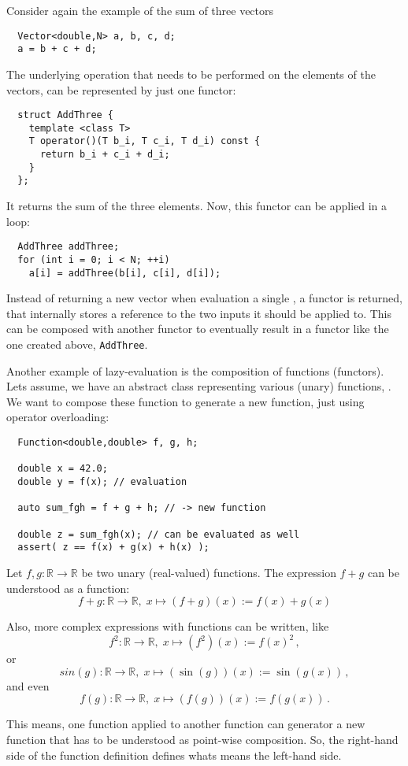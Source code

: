 \begin{example}
  Consider again the example of the sum of three vectors
  \begin{verbatim}
  Vector<double,N> a, b, c, d;
  a = b + c + d;
  \end{verbatim}
  The underlying operation that needs to be performed on the elements of the vectors, can be represented by
  just one functor:
  \begin{verbatim}
  struct AddThree {
    template <class T>
    T operator()(T b_i, T c_i, T d_i) const {
      return b_i + c_i + d_i;
    }
  };
  \end{verbatim}
  It returns the sum of the three elements. Now, this functor can be applied in a loop:
  \begin{verbatim}
  AddThree addThree;
  for (int i = 0; i < N; ++i)
    a[i] = addThree(b[i], c[i], d[i]);
  \end{verbatim}
  Instead of returning a new vector when evaluation a single , a functor is returned, that internally stores
  a reference to the two inputs it should be applied to. This can be composed with another functor to eventually result in a functor like
  the one created above, \texttt{AddThree}.
\end{example}

\begin{example}
  Another example of lazy-evaluation is the composition of functions (functors). Lets assume, we have an abstract class
  representing various (unary) functions, . We want to compose these function to generate
  a new function, just using operator overloading:
  \begin{verbatim}
  Function<double,double> f, g, h;

  double x = 42.0;
  double y = f(x); // evaluation

  auto sum_fgh = f + g + h; // -> new function

  double z = sum_fgh(x); // can be evaluated as well
  assert( z == f(x) + g(x) + h(x) );
  \end{verbatim}

  Let $f, g:\mathbb{R}\to\mathbb{R}$ be two unary (real-valued) functions. The expression $f+g$ can be understood as a function:
  \[
    f+g:\mathbb{R}\to\mathbb{R},\;x\mapsto(f+g)(x) := f(x) + g(x)
  \]

  Also, more complex expressions with functions can be written, like
  \[
    f^2:\mathbb{R}\to\mathbb{R},\;x\mapsto(f^2)(x) := f(x)^2\,,
  \]
  or
  \[
    sin(g):\mathbb{R}\to\mathbb{R},\;x\mapsto(\sin(g))(x) := \sin(g(x))\,,
  \]
  and even
  \[
    f(g):\mathbb{R}\to\mathbb{R},\;x\mapsto(f(g))(x) := f(g(x))\,.
  \]

  This means, one function applied to another function can generator a new function that has to be understood as point-wise composition. So, the right-hand
  side of the function definition defines whats means the left-hand side.
\end{example}


